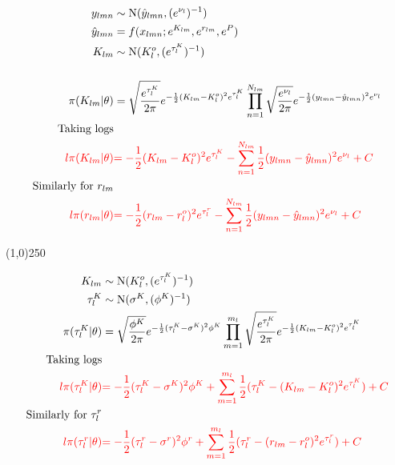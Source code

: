 \begin{align*}
y_{lmn} &\sim \operatorname{N}(\hat{y}_{lmn},(e^{ \nu_{l}})^{-1} ) \\
\hat{y}_{lmn} &= f(x_{lmn};e^{ K_{lm} } ,e^{ r_{lm} } , e^{ P })\\
K_{lm} &\sim \operatorname{N}(K_{l}^o, (e^{ \tau_{l}^K })^{-1} )\\
\\
\pi(K_{lm}|\theta)&=
\sqrt{\frac{e^{ \tau_{l}^K }}{2\pi}} e^{-\frac{1}{2}(K_{lm}-K_{l}^o)^{2}e^{ \tau_{l}^K } }
\prod_{n=1}^{N_{lm}}\sqrt{\frac{e^{ \nu_{l}}}{2\pi}} e^{-\frac{1}{2}(y_{lmn}-\hat{y}_{lmn})^{2}e^{ \nu_{l}} }\\
\text{Taking logs}\\
\color{red}{l\pi(K_{lm}|\theta)}&
\color{red}{
=-\frac{1}{2}(K_{lm}-K_{l}^o)^{2}e^{\tau_{l}^K }
-
\sum_{n=1}^{N_{lm}}\frac{1}{2}(y_{lmn}-\hat{y}_{lmn})^{2}e^{\nu_{l}}
+C
}\\
\text{Similarly for $r_{lm}$}\\
\color{red}{l\pi(r_{lm}|\theta)}&
\color{red}{
=-\frac{1}{2}(r_{lm}-r_{l}^o)^{2}e^{ \tau_{l}^r}
-
\sum_{n=1}^{N_{lm}}\frac{1}{2}(y_{lmn}-\hat{y}_{lmn})^{2}e^{ \nu_{l} }
+C
} 
\end{align*}

\begin{center}
\line(1,0){250}
\end{center}

\begin{align*}
K_{lm} &\sim \operatorname{N}(K_{l}^o, (e^{ \tau_{l}^K })^{-1} )\\
\tau_{l}^K &\sim \operatorname{N}(\sigma^{K}, (\phi^{K})^{-1} )\\
\pi(\tau_{l}^K|\theta)&=
\sqrt{\frac{\phi^{K}}{2\pi}} e^{-\frac{1}{2}(\tau_{l}^K-\sigma^{K})^{2}\phi^{K} }
\prod_{m=1}^{m_{l}}
\sqrt{\frac{e^{ \tau_{l}^K }}{2\pi}} e^{-\frac{1}{2}(K_{lm}-K_{l}^o)^{2}e^{ \tau_{l}^K } }\\
\text{Taking logs}\\
\color{red}{l\pi(\tau_{l}^K|\theta)}&
\color{red}{
=-\frac{1}{2}(\tau_{l}^K-\sigma^{K})^{2}\phi^{K}
+
\sum_{m=1}^{m_{l}}\frac{1}{2}(\tau_{l}^K -(K_{lm}-K_{l}^o)^{2}e^{\tau_{l}^K })
+C
}\\
\text{Similarly for $\tau_{l}^r$}\\
\color{red}{l\pi(\tau_{l}^r|\theta)}&
\color{red}{
=-\frac{1}{2}(\tau_{l}^r-\sigma^{r})^{2}\phi^{r}
+
\sum_{m=1}^{m_{l}}\frac{1}{2}(\tau_{l}^r -(r_{lm}-r_{l}^o)^{2}e^{\tau_{l}^r })
+C
}
\end{align*}